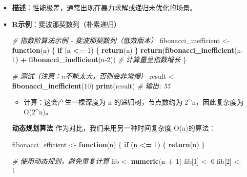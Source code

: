 \documentclass[
  twoside]{book}
\newenvironment{Shaded}{\begin{snugshade}}{\end{snugshade}}
\newcommand{\CommentTok}[1]{\textcolor[rgb]{0.56,0.35,0.01}{\textit{#1}}}
\newcommand{\ControlFlowTok}[1]{\textcolor[rgb]{0.13,0.29,0.53}{\textbf{#1}}}
\newcommand{\DecValTok}[1]{\textcolor[rgb]{0.00,0.00,0.81}{#1}}
\newcommand{\FunctionTok}[1]{\textcolor[rgb]{0.13,0.29,0.53}{\textbf{#1}}}
\newcommand{\NormalTok}[1]{#1}
\newcommand{\OtherTok}[1]{\textcolor[rgb]{0.56,0.35,0.01}{#1}}
\newcommand{\SpecialCharTok}[1]{\textcolor[rgb]{0.81,0.36,0.00}{\textbf{#1}}}
\providecommand{\tightlist}{%
  \setlength{\itemsep}{0pt}\setlength{\parskip}{0pt}}
\begin{document}
\begin{itemize}
\item
  \textbf{描述}：性能极差，通常出现在暴力求解或递归未优化的场景。
\item
  \textbf{R示例}：斐波那契数列（朴素递归）

\begin{Shaded}
\begin{Highlighting}[]
\CommentTok{\# 指数阶算法示例 {-} 斐波那契数列（低效版本）}
\NormalTok{fibonacci\_inefficient }\OtherTok{\textless{}{-}} \ControlFlowTok{function}\NormalTok{(n) \{}
  \ControlFlowTok{if}\NormalTok{ (n }\SpecialCharTok{\textless{}=} \DecValTok{1}\NormalTok{) \{}
    \FunctionTok{return}\NormalTok{(n)}
\NormalTok{  \}}
  \FunctionTok{return}\NormalTok{(}\FunctionTok{fibonacci\_inefficient}\NormalTok{(n}\DecValTok{{-}1}\NormalTok{) }\SpecialCharTok{+} \FunctionTok{fibonacci\_inefficient}\NormalTok{(n}\DecValTok{{-}2}\NormalTok{))  }\CommentTok{\# 计算量呈指数增长}
\NormalTok{\}}

\CommentTok{\# 测试（注意：n不能太大，否则会非常慢）}
\NormalTok{result }\OtherTok{\textless{}{-}} \FunctionTok{fibonacci\_inefficient}\NormalTok{(}\DecValTok{10}\NormalTok{)}
\FunctionTok{print}\NormalTok{(result)  }\CommentTok{\# 输出: 55}
\end{Highlighting}
\end{Shaded}

  \begin{itemize}
  \tightlist
  \item
    计算：这会产生一棵深度为 n 的递归树，节点数约为 2\^{}n，因此复杂度为 O(2\^{}n)。
  \end{itemize}

  \textbf{动态规划算法} 作为对比，我们来用另一种时间复杂度 O(n)的算法：

\begin{Shaded}
\begin{Highlighting}[]
\NormalTok{fibonacci\_efficient }\OtherTok{\textless{}{-}} \ControlFlowTok{function}\NormalTok{(n) \{}
  \ControlFlowTok{if}\NormalTok{ (n }\SpecialCharTok{\textless{}=} \DecValTok{1}\NormalTok{) \{}
    \FunctionTok{return}\NormalTok{(n)}
\NormalTok{\}}

\CommentTok{\# 使用动态规划，避免重复计算}
\NormalTok{fib }\OtherTok{\textless{}{-}} \FunctionTok{numeric}\NormalTok{(n }\SpecialCharTok{+} \DecValTok{1}\NormalTok{)}
\NormalTok{fib[}\DecValTok{1}\NormalTok{] }\OtherTok{\textless{}{-}} \DecValTok{0}
\NormalTok{fib[}\DecValTok{2}\NormalTok{] }\OtherTok{\textless{}{-}} \DecValTok{1}


\end{Highlighting}
\end{Shaded}
\end{itemize}
\end{document}

